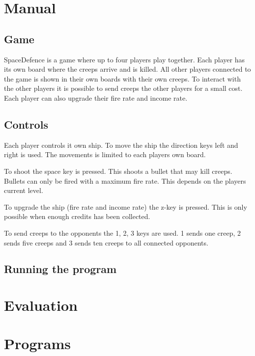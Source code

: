 \documentclass[a4paper]{article}
\begin{document}
\section{Manual}

\subsection{Game}

SpaceDefence is a game where up to four players play together. 
Each player has its own board where the creeps arrive and is killed.
All other players connected to the game is shown in their own boards with their own creeps.
To interact with the other players it is possible to send creeps the other players for a small cost. 
Each player can also upgrade their fire rate and income rate.

\subsection{Controls}

Each player controls it own ship. 
To move the ship the direction keys left and right is used. The movements is limited to each players own board.

To shoot the space key is pressed. This shoots a bullet that may kill creeps.
Bullets can only be fired with a maximum fire rate. This depends on the players current level.

To upgrade the ship (fire rate and income rate) the z-key is pressed. This is only possible when enough credits has been collected.

To send creeps to the opponents the 1, 2, 3 keys are used.
1 sends one creep, 2 sends five creeps and 3 sends ten creeps to all connected opponents.

\subsection{Running the program}

\section{Evaluation}

\section{Programs}
\end{document}
